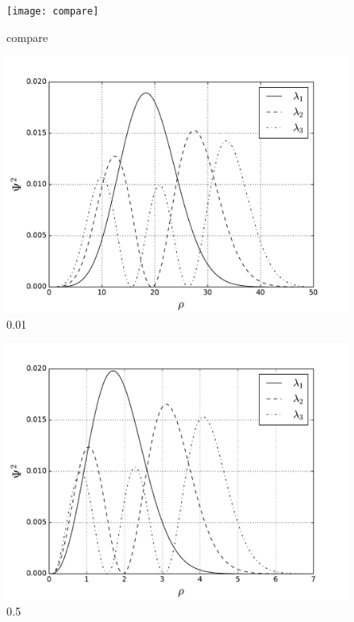 \documentclass[10pt]{article}
\begin{document}
\begin{figure}
  \begin{center}
    \texttt{[image: compare]}
    \caption{compare}
    \label{fig:compare}
  \end{center}
\end{figure}
\newpage
\begin{figure}
  \begin{center}
    \includegraphics[scale=0.7]{two_001}
    \caption{0.01}
    \label{fig:omega_0.01}
  \end{center}
\end{figure}
\newpage

\begin{figure}
  \begin{center}
    \includegraphics[scale=0.7]{two_05}
    \caption{0.5}
    \label{fig:omega_0.5}
  \end{center}
\end{figure}
\newpage
\end{document}
